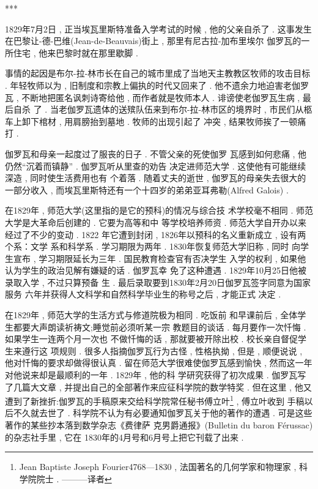 \begin{center}***
\end{center}

1829年7月2日 , 正当埃瓦里斯特准备入学考试的时候 , 他的父亲自杀了 . 这事发生在巴黎让-德-巴维(Jean-de-Beauvais)街上 , 那里有尼古拉-加布里埃尔 \textbullet 伽罗瓦的一所住宅 , 他来巴黎时就在那里歇脚 . 

事情的起因是布尔-拉-林市长在自己的城市里成了当地天主教教区牧师的攻击目标 . 年轻牧师以为 , 旧制度和宗教上偏执的时代又回来了 . 他不遗余力地迫害老伽罗瓦 , 不断地把匿名讽刺诗寄给他 , 而作者就是牧师本人 . 诽谤使老伽罗瓦生病 , 最后自杀 了 . 当老伽罗瓦遗体的送殡队伍来到布尔-拉-林市区的境界时 , 市民们从柩车上卸下棺材 , 用肩膀抬到墓地 . 牧师的出现引起了 冲突 , 结果牧师挨了一顿痛打 . 

伽罗瓦和母亲一起度过了服丧的日子 . 不管父亲的死使伽罗 瓦感到如何悲痛 , 他仍然“沉着而镇静” . 伽罗瓦听从里查的劝告 决定进师范大学 . 这使他有可能继续深造 , 同时使生活费用也有 个着落 . 随着丈夫的逝世 , 伽罗瓦的母亲失去很大的一部分收入 ,  而埃瓦里斯特还有一个十四岁的弟弟亚耳弗勒(Alfred Galois) . 

在1829年 , 师范大学(这里指的是它的预科)的情况与综合技 术学校毫不相同 . 师范大学是大革命后创建的 . 它要为高等和中 等学校培养师资 . 师范大学自开办以来经过了不少的变动 . 1822 年它遭到封闭 , 1826年以预科的名义重新成立 , 设有两个系：文学 系和科学系 . 学习期限为两年 .  1830年恢复师范大学旧称 , 同时 向学生宣布 , 学习期限延长为三年 . 国民教育检查官有否决学生 入学的权利 , 如果他认为学生的政治见解有嫌疑的话 . 伽罗瓦幸 免了这种遭遇 . 1829年10月25日他被录取入学 , 不过只算预备 生 . 最后录取要到1830年2月20日伽罗瓦签字同意为国家服务 六年并获得人文科学和自然科学毕业生的称号之后 , 才能正式 决定 . 

在1829年 , 师范大学的生活方式与修道院极为相同 . 吃饭前 和早课前后 , 全体学生都要大声朗读祈祷文;睡觉前必须听某一宗 教题目的谈话 . 每月要作一次忏悔 . 如果学生一连两个月一次也 不做忏悔的话 , 那就要被开除出校 . 校长亲自督促学生来遵行这 项规则 . 很多人指摘伽罗瓦行为古怪 , 性格执拗 , 但是 , 顺便说说 ,  他对忏悔的要求却做得很认真 . 留在师范大学很难使伽罗瓦感到愉快 , 然而这一年对他说来却是最顺利的一年 . 1829年 , 他的科 学研究获得了初次成果 . 伽罗瓦写了几篇大文章 , 并提出自己的全部著作来应征科学院的数学特奖 . 但在这里 , 他又遭到了新挫折:伽罗瓦的手稿原来交给科学院常任秘书傅立叶\footnote{Jean Baptiste Joseph Fourier4768—1830 , 法国著名的几何学家和物理家 ,  科学院院士 . ———译者} , 傅立叶收到 手稿以后不久就去世了 . 科学院不认为有必要通知伽罗瓦关于他的著作的遭遇 . 可是这些著作的某些抄本落到数学杂志《费律萨 克男爵通报》(Bulletin du baron Férussac)的杂志社手里 , 它在 1830年的4月号和6月号上把它刊载了出来 . 

